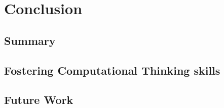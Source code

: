 %
\chapter{Conclusion}
\label{sec:conclusion}

\section{Summary}

\section{Fostering Computational Thinking skills}

\section{Future Work}
